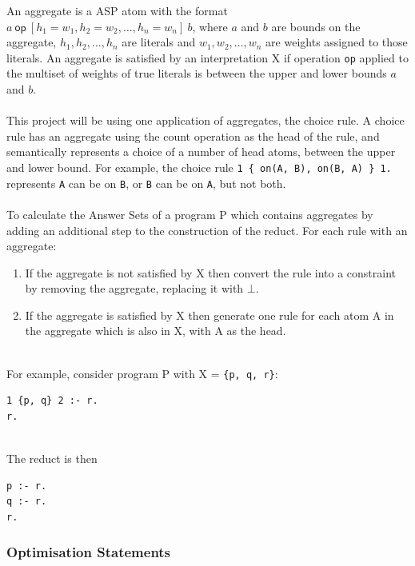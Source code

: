 An aggregate \cite{Eiter2008} is a ASP atom with the format $a \: \textsf{op} \: [h_1=w_1, h_2=w_2, \dots, h_n=w_n 	] \: b$, where $a$ and $b$ are bounds on the aggregate, $h_1, h_2, \dots, h_n$ are literals and $w_1, w_2, \dots, w_n$ are weights assigned to those literals. An aggregate is satisfied by an interpretation X if operation \lstinline!op! applied to the multiset of weights of true literals is between the upper and lower bounds $a$ and $b$. \\ \\
This project will be using one application of aggregates, the choice rule. A choice rule has an aggregate using the count operation as the head of the rule, and semantically represents a choice of a number of head atoms, between the upper and lower bound. For example, the choice rule \lstinline!1 { on(A, B), on(B, A) } 1.! represents \lstinline!A! can be on \lstinline!B!, or \lstinline!B! can be on \lstinline!A!, but not both. \\ \\
To calculate the Answer Sets of a program P which contains aggregates by adding an additional step to the construction of the reduct. For each rule with an aggregate:

\begin{enumerate}
\item If the aggregate is not satisfied by X then convert the rule into a constraint by removing the aggregate, replacing it with $\bot$.
\item If the aggregate is satisfied by X then generate one rule for each atom A in the aggregate which is also in X, with A as the head.
\end{enumerate}
\mbox{}\\
For example, consider program P with X = \lstinline!{p, q, r}!:\\

\begin{lstlisting}
1 {p, q} 2 :- r.
r.
\end{lstlisting}
\mbox{}\\
The reduct is then \\

\begin{lstlisting}
p :- r.
q :- r.
r.
\end{lstlisting}

\subsubsection{Optimisation Statements}

